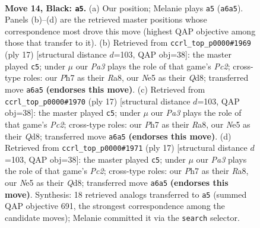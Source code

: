 \documentclass[11pt]{article}
\begin{document}
\clearpage

\begin{figure}[p]\centering
\begin{subfigure}{0.46\textwidth}\centering
\resizebox{\linewidth}{!}{%
\newchessgame
\chessboard[
  setfen={r2q4/1bp2kpp/pb1p1n2/1p2n3/4P3/2P5/PPQ2PPP/RNB1R1K1 b - - 1 14},
  showmover=false,
  pgfstyle=straightmove, color=movearrow, markmove={a6-a5}
]}
\caption{}
\end{subfigure}\hfill
\begin{subfigure}{0.46\textwidth}\centering
\resizebox{\linewidth}{!}{%
\newchessgame
\chessboard[
  setfen={r2qkb1r/pbpn1ppp/1p2p3/8/3PP3/P1P2N2/2Q2PPP/R1B1KB1R b KQkq - 0 9},
  showmover=false,
  pgfstyle=straightmove, color=movearrow, markmove={c7-c5}
]}
\caption{}
\end{subfigure}
\\[4pt]
\begin{subfigure}{0.46\textwidth}\centering
\resizebox{\linewidth}{!}{%
\newchessgame
\chessboard[
  setfen={r2qkb1r/pbpn1ppp/1p2p3/8/3PP3/P1P2N2/2Q2PPP/R1B1KB1R b KQkq - 0 9},
  showmover=false,
  pgfstyle=straightmove, color=movearrow, markmove={c7-c5}
]}
\caption{}
\end{subfigure}\hfill
\begin{subfigure}{0.46\textwidth}\centering
\resizebox{\linewidth}{!}{%
\newchessgame
\chessboard[
  setfen={r2qkb1r/pbpn1ppp/1p2p3/8/3PP3/P1P2N2/2Q2PPP/R1B1KB1R b KQkq - 0 9},
  showmover=false,
  pgfstyle=straightmove, color=movearrow, markmove={c7-c5}
]}
\caption{}
\end{subfigure}
\caption{\textbf{Move 14, Black: \texttt{a5}.} (a) Our position; Melanie plays \texttt{a5} (\texttt{a6a5}). Panels (b)--(d) are the retrieved master positions whose correspondence most drove this move (highest QAP objective among those that transfer to it). (b) Retrieved from \texttt{ccrl\_top\_p0000\#1969} (ply 17) [structural distance $d$=103, QAP obj=38]: the master played \texttt{c5}; under $\mu$ our \emph{Pa3} plays the role of that game's \emph{Pc2}; cross-type roles: our \emph{P}h7 as their \emph{R}a8, our \emph{N}e5 as their \emph{Q}d8; transferred move \texttt{a6a5} \textbf{(endorses this move)}. (c) Retrieved from \texttt{ccrl\_top\_p0000\#1970} (ply 17) [structural distance $d$=103, QAP obj=38]: the master played \texttt{c5}; under $\mu$ our \emph{Pa3} plays the role of that game's \emph{Pc2}; cross-type roles: our \emph{P}h7 as their \emph{R}a8, our \emph{N}e5 as their \emph{Q}d8; transferred move \texttt{a6a5} \textbf{(endorses this move)}. (d) Retrieved from \texttt{ccrl\_top\_p0000\#1971} (ply 17) [structural distance $d$=103, QAP obj=38]: the master played \texttt{c5}; under $\mu$ our \emph{Pa3} plays the role of that game's \emph{Pc2}; cross-type roles: our \emph{P}h7 as their \emph{R}a8, our \emph{N}e5 as their \emph{Q}d8; transferred move \texttt{a6a5} \textbf{(endorses this move)}. Synthesis: 18 retrieved analogs transferred to \texttt{a5} (summed QAP objective 691, the strongest correspondence among the candidate moves); Melanie committed it via the \texttt{search} selector.}
\label{fig:thought-m27}
\end{figure}
\end{document}
